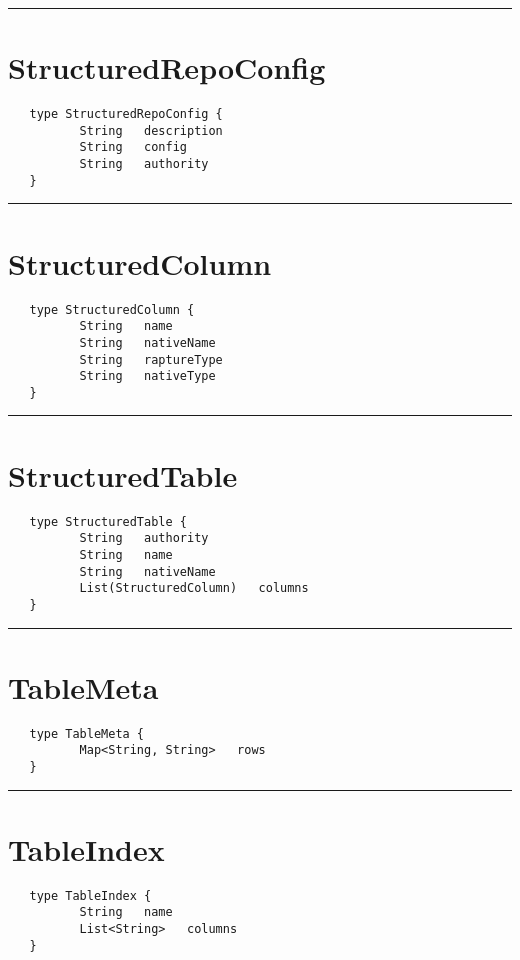 \rule{15cm}{2pt}
\section{StructuredRepoConfig}
\label{type:StructuredRepoConfig}

\begin{verbatim}
   type StructuredRepoConfig {
          String   description
          String   config
          String   authority
   }
\end{verbatim}

\rule{15cm}{2pt}
\section{StructuredColumn}
\label{type:StructuredColumn}

\begin{verbatim}
   type StructuredColumn {
          String   name
          String   nativeName
          String   raptureType
          String   nativeType
   }
\end{verbatim}

\rule{15cm}{2pt}
\section{StructuredTable}
\label{type:StructuredTable}

\begin{verbatim}
   type StructuredTable {
          String   authority
          String   name
          String   nativeName
          List(StructuredColumn)   columns
   }
\end{verbatim}

\rule{15cm}{2pt}
\section{TableMeta}
\label{type:TableMeta}

\begin{verbatim}
   type TableMeta {
          Map<String, String>   rows
   }
\end{verbatim}

\rule{15cm}{2pt}
\section{TableIndex}
\label{type:TableIndex}

\begin{verbatim}
   type TableIndex {
          String   name
          List<String>   columns
   }
\end{verbatim}

